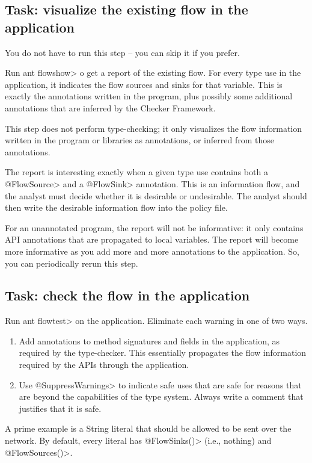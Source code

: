 \subsection{Task: visualize the existing flow in the application}

You do not have to run this step -- you can skip it if you
prefer.

Run \<ant flowshow> o get a report of the
existing flow.
For every type use in the application, it indicates the flow sources
and sinks for that variable. This is exactly the annotations written
in the program, plus possibly some additional annotations that are
inferred by the Checker Framework.


This step does not perform type-checking; it only visualizes the flow
information written in the program or libraries as annotations, or
inferred from those annotations.

The report is interesting exactly when a given type use contains both
a \<@FlowSource> and a \<@FlowSink> annotation. This is an information flow,
and the analyst must decide whether it is desirable or undesirable.  The analyst
should then write the desirable information flow into the policy file.

For an unannotated program, the report will not be informative: it
only contains API annotations that are propagated to local
variables. The report will become more informative as you add more and
more annotations to the application. So, you can periodically rerun
this step. 


\subsection{Task: check the flow in the application}

Run \<ant flowtest> on the application.
Eliminate each warning in one of two ways.
\begin{enumerate}
\item Add annotations to method signatures and fields in the application, as
required by the type-checker. This essentially propagates the flow
information required by the APIs through the application.

\item Use \<@SuppressWarnings> to indicate safe uses that are safe for reasons
that are beyond the capabilities of the type system. Always write a
comment that justifies that it is safe.
\end{enumerate}
A prime example is a String literal that should be allowed to be sent
over the network. By default, every literal has \<@FlowSinks()>
(i.e., nothing) and \<@FlowSources()>.

